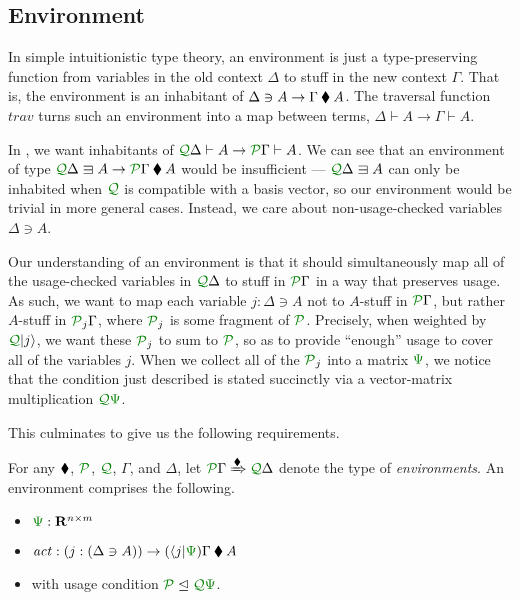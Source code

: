 \documentclass[submission,copyright,creativecommons]{eptcs}
\begin{document}
\subsection{Environment}

In simple intuitionistic type theory, an environment is just a type-preserving
function from variables in the old context $\Delta$ to stuff in the new context
$\Gamma$.
That is, the environment is an inhabitant of
$\Delta \ni A \to \Gamma \mathbin{\blacklozenge} A$.
The traversal function $\mathit{trav}$ turns such an environment into a map
between terms, $\Delta \vdash A \to \Gamma \vdash A$.

In \name{}, we want inhabitants of
$\ctx{\Delta}{Q} \vdash A \to \ctx{\Gamma}{P} \vdash A$.
We can see that an environment of type
$\ctx{\Delta}{Q} \lvar A \to \ctx{\Gamma}{P} \kitrel A$ would
be insufficient --- $\ctx{\Delta}{Q} \lvar A$ can only be inhabited when
$\resctx Q$ is compatible with a basis vector, so our environment would be
trivial in more general cases.
Instead, we care about non-usage-checked variables $\Delta \ni A$.

Our understanding of an environment is that it should simultaneously map all of
the usage-checked variables in $\ctx{\Delta}{Q}$ to stuff in $\ctx{\Gamma}{P}$
in a way that preserves usage.
As such, we want to map each variable $j : \Delta \ni A$ not to $A$-stuff in
$\ctx{\Gamma}{P}$, but rather $A$-stuff in $\resctx P_j\Gamma$,
where $\resctx P_j$ is some fragment of $\resctx P$.
Precisely, when weighted by $\resctx Q\lvert j \rangle$, we want these
$\resctx P_j$ to sum to $\resctx P$, so as to provide ``enough'' usage to cover
all of the variables $j$.
When we collect all of the $\resctx P_j$ into a matrix $\rescomment\Psi$, we
notice that the condition just described is stated succinctly via a
vector-matrix multiplication $\resctx Q\rescomment\Psi$.

This culminates to give us the following requirements.

\begin{definition}\label{def:env}
  For any $\mathbin{\blacklozenge}$, $\resctx P$, $\resctx Q$, $\Gamma$, and $\Delta$, let
  $\ctx{\Gamma}{P} \subst{\kitrel} \ctx{\Delta}{Q}$ denote the type of
  \emph{environments}.
  An environment comprises the following.
\begin{itemize}
  \item $\rescomment\Psi : \mathbf R^{n \times m}$
  \item $\mathit{act} :
    (j : (\Delta \ni A)) \to (\langle j \rvert\rescomment\Psi)\Gamma \kitrel A$
  \item with usage condition $\resctx P \subres \resctx Q \rescomment\Psi$.
\end{itemize}
\end{definition}
\end{document}
